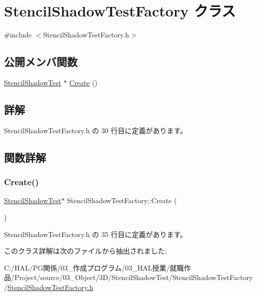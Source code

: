 \hypertarget{class_stencil_shadow_test_factory}{}\section{Stencil\+Shadow\+Test\+Factory クラス}
\label{class_stencil_shadow_test_factory}


{\ttfamily \#include $<$Stencil\+Shadow\+Test\+Factory.\+h$>$}

\subsection*{公開メンバ関数}
\begin{DoxyCompactItemize}
\item 
\mbox{\hyperlink{class_stencil_shadow_test}{Stencil\+Shadow\+Test}} $\ast$ \mbox{\hyperlink{class_stencil_shadow_test_factory_a4eec5b125ff810267c784c8a922909a2}{Create}} ()
\end{DoxyCompactItemize}


\subsection{詳解}


 Stencil\+Shadow\+Test\+Factory.\+h の 30 行目に定義があります。



\subsection{関数詳解}
\mbox{\label{class_stencil_shadow_test_factory_a4eec5b125ff810267c784c8a922909a2}} 
\subsubsection{\texorpdfstring{Create()}{Create()}}
{\footnotesize\ttfamily \mbox{\hyperlink{class_stencil_shadow_test}{Stencil\+Shadow\+Test}}$\ast$ Stencil\+Shadow\+Test\+Factory\+::\+Create (\begin{DoxyParamCaption}{ }\end{DoxyParamCaption})\hspace{0.3cm}{\ttfamily [inline]}}



 Stencil\+Shadow\+Test\+Factory.\+h の 35 行目に定義があります。



このクラス詳解は次のファイルから抽出されました\+:\begin{DoxyCompactItemize}
\item 
C\+:/\+H\+A\+L/\+P\+G関係/03\+\_\+作成プログラム/03\+\_\+\+H\+A\+L授業/就職作品/\+Project/source/03\+\_\+\+Object/3\+D/\+Stencil\+Shadow\+Test/\+Stencil\+Shadow\+Test\+Factory/\mbox{\hyperlink{_stencil_shadow_test_factory_8h}{Stencil\+Shadow\+Test\+Factory.\+h}}\end{DoxyCompactItemize}

